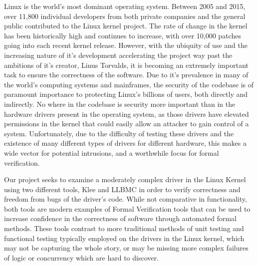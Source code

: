 Linux is the world’s most dominant operating system.
Between 2005 and 2015, over 11,800 individual developers from both private companies
and the general public contributed to the Linux kernel project.
The rate of change in the kernel has been historically high and continues to increase,
with over 10,000 patches going into each recent kernel release. \cite{linux}
However, with the ubiquity of use and the increasing nature of it's development
accelerating the project way past the ambitions of it's creator, Linus Torvalds,
it is becoming an extremely important task to ensure the correctness of the software.
Due to it's prevalence in many of the world's computing systems and mainframes,
the security of the codebase is of paramount importance to protecting Linux's billions 
of users, both directly and indirectly.
No where in the codebase is security more important than in the hardware drivers present in
the operating system, as those drivers have elevated permissions in the kernel
that could easily allow an attacker to gain control of a system.
Unfortunately, due to the difficulty of testing these drivers and the existence of
many different types of drivers for different hardware, this makes a wide vector
for potential intrusions, and a worthwhile focus for formal verification.
\par
Our project seeks to examine a moderately complex driver in the Linux Kernel 
using two different tools, Klee \cite{klee} and LLBMC \cite{llbmc} in order to verify
correctness and freedom from bugs of the driver's code.
While not comparative in functionality, both tools are modern examples of Formal 
Verification tools that can be used to increase confidence in the correctness of software
through automated formal methods.
These tools contrast to more traditional methods of unit testing and functional testing
typically employed on the drivers in the Linux kernel, which may not be capturing the whole
story, or may be missing more complex failures of logic or concurrency which are hard to discover.

